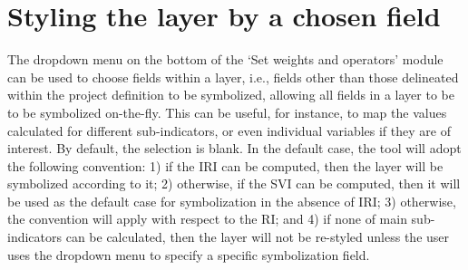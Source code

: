 \section{Styling the layer by a chosen field}

The dropdown menu on the bottom of the `Set weights and operators' module can
be used to choose fields within a layer, i.e., fields other than those
delineated within the project definition to be symbolized, allowing all fields
in a layer to be to be symbolized on-the-fly.  This can be useful, for
instance, to map the values calculated for different sub-indicators, or even
individual variables if they are of interest. By default, the selection is
blank. In the default case, the tool will adopt the following convention: 1) if
the IRI can be computed, then the layer will be symbolized according to it; 2)
otherwise, if the SVI can be computed, then it will be used as the default case
for symbolization in the absence of IRI; 3) otherwise, the convention will
apply with respect to the RI; and 4) if none of main sub-indicators can be
calculated, then the layer will not be re-styled unless the user uses the
dropdown menu to specify a specific symbolization field.
